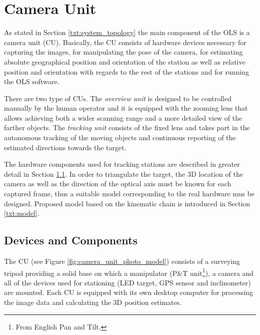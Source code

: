 \section{Camera Unit} \label{txt:camera_unit}

As stated in Section \ref{txt:system_topology} the main component of the OLS is a camera unit (CU). Basically, the CU consists of hardware devices necessary for capturing the images, for manipulating the pose of the camera, for estimating absolute geographical position and orientation of the station as well as relative position and orientation with regards to the rest of the stations and for running the OLS software.

There are two type of CUs. The \textit{overview unit} is designed to be controlled manually by the human operator and it is equipped with the zooming lens that allows achieving both a wider scanning range and a more detailed view of the farther objects. The \textit{tracking unit} consists of the fixed lens and takes part in the autonomous tracking of the moving objects and continuous reporting of the estimated directions towards the target.

The hardware components used for tracking stations are described in greater detail in Section \ref{txt:devices}. In order to triangulate the target, the 3D location of the camera as well as the direction of the optical axis must be known for each captured frame, thus a suitable model corresponding to the real hardware mus be designed. Proposed model based on the kinematic chain is introduced in Section \ref{txt:model}.

\subsection{Devices and Components} \label{txt:devices}

The CU (see Figure \ref{fig:camera_unit_photo_model}) consists of a surveying tripod providing a solid base on which a manipulator (P\&T unit\footnote{From English Pan and Tilt.}), a camera and all of the devices used for stationing (LED target, GPS sensor and inclinometer) are mounted. Each CU is equipped with its own desktop computer for processing the image data and calculating the 3D position estimates.

